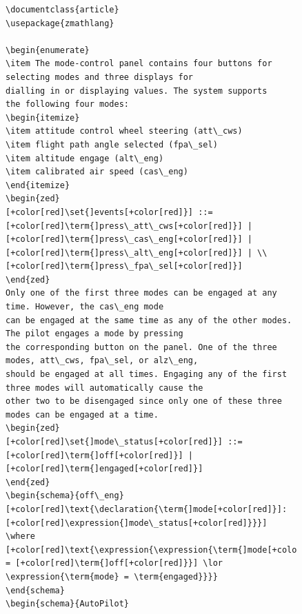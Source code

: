  \begin{figure}[H]
 \centering
 \begin{minipage}{0.45\textwidth}
 \centering
 \begin{tiny}
 \begin{BVerbatim}[commandchars=+\[\]]
\documentclass{article}
\usepackage{zmathlang}

\begin{enumerate}
\item The mode-control panel contains four buttons for 
selecting modes and three displays for
dialling in or displaying values. The system supports 
the following four modes:
\begin{itemize}
\item attitude control wheel steering (att\_cws)
\item flight path angle selected (fpa\_sel)
\item altitude engage (alt\_eng)
\item calibrated air speed (cas\_eng)
\end{itemize}
\begin{zed}
[+color[red]\set{]events[+color[red]}] ::= [+color[red]\term{]press\_att\_cws[+color[red]}] |  [+color[red]\term{]press\_cas\_eng[+color[red]}] | [+color[red]\term{]press\_alt\_eng[+color[red]}] | \\
[+color[red]\term{]press\_fpa\_sel[+color[red]}]
\end{zed}
Only one of the first three modes can be engaged at any time. However, the cas\_eng mode
can be engaged at the same time as any of the other modes. The pilot engages a mode by pressing
the corresponding button on the panel. One of the three modes, att\_cws, fpa\_sel, or alz\_eng,
should be engaged at all times. Engaging any of the first three modes will automatically cause the
other two to be disengaged since only one of these three modes can be engaged at a time. 
\begin{zed}
[+color[red]\set{]mode\_status[+color[red]}] ::= [+color[red]\term{]off[+color[red]}] | [+color[red]\term{]engaged[+color[red]}]
\end{zed}
\begin{schema}{off\_eng}
[+color[red]\text{\declaration{\term{]mode[+color[red]}]: [+color[red]\expression{]mode\_status[+color[red]}}}]
\where
[+color[red]\text{\expression{\expression{\term{]mode[+color[red]}] = [+color[red]\term{]off[+color[red]}}] \lor \expression{\term{mode} = \term{engaged}}}}
\end{schema}
\begin{schema}{AutoPilot}

\end{BVerbatim}
\end{tiny}
\end{minipage}
\end{figure}
